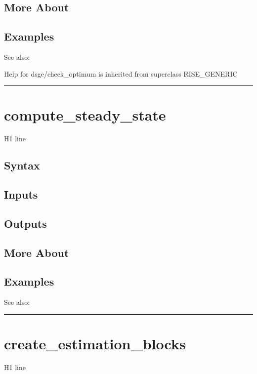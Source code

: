 \documentclass[letterpaper,10pt,english]{sphinxmanual}
\begin{document}
\subsection{More About}
\label{classes/models/@dsge/dsge:id6}

\subsection{Examples}
\label{classes/models/@dsge/dsge:id7}
See also:

Help for dsge/check\_optimum is inherited from superclass RISE\_GENERIC


\bigskip\hrule{}\bigskip



\section{compute\_steady\_state}
\label{classes/models/@dsge/dsge:id8}\label{classes/models/@dsge/dsge:compute-steady-state}
H1 line


\subsection{Syntax}
\label{classes/models/@dsge/dsge:id9}

\subsection{Inputs}
\label{classes/models/@dsge/dsge:id10}

\subsection{Outputs}
\label{classes/models/@dsge/dsge:id11}

\subsection{More About}
\label{classes/models/@dsge/dsge:id12}

\subsection{Examples}
\label{classes/models/@dsge/dsge:id13}
See also:


\bigskip\hrule{}\bigskip



\section{create\_estimation\_blocks}
\label{classes/models/@dsge/dsge:create-estimation-blocks}\label{classes/models/@dsge/dsge:id14}
H1 line
\end{document}
